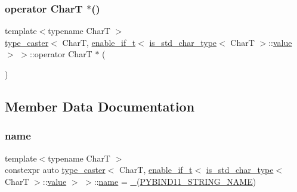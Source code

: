 \subsubsection{\texorpdfstring{operator CharT $\ast$()}{operator CharT *()}}
{\footnotesize\ttfamily template$<$typename CharT $>$ \\
\mbox{\hyperlink{classtype__caster}{type\+\_\+caster}}$<$ CharT, \mbox{\hyperlink{detail_2common_8h_a012819c9e8b5e04872a271f50f8b8196}{enable\+\_\+if\+\_\+t}}$<$ \mbox{\hyperlink{cast_8h_a0ee0eaf3d12f9b0e472ed620777ba3c3}{is\+\_\+std\+\_\+char\+\_\+type}}$<$ CharT $>$\+::\mbox{\hyperlink{_s_d_l__opengl__glext_8h_a8ad81492d410ff2ac11f754f4042150f}{value}} $>$ $>$\+::operator CharT $\ast$ (\begin{DoxyParamCaption}{ }\end{DoxyParamCaption})\hspace{0.3cm}{\ttfamily [inline]}}



\subsection{Member Data Documentation}
\mbox{\label{structtype__caster_3_01_char_t_00_01enable__if__t_3_01is__std__char__type_3_01_char_t_01_4_1_1value_01_4_01_4_ac5b1cfa08e19fa977b842cf65d4e5722}} 
\subsubsection{\texorpdfstring{name}{name}}
{\footnotesize\ttfamily template$<$typename CharT $>$ \\
constexpr auto \mbox{\hyperlink{classtype__caster}{type\+\_\+caster}}$<$ CharT, \mbox{\hyperlink{detail_2common_8h_a012819c9e8b5e04872a271f50f8b8196}{enable\+\_\+if\+\_\+t}}$<$ \mbox{\hyperlink{cast_8h_a0ee0eaf3d12f9b0e472ed620777ba3c3}{is\+\_\+std\+\_\+char\+\_\+type}}$<$ CharT $>$\+::\mbox{\hyperlink{_s_d_l__opengl__glext_8h_a8ad81492d410ff2ac11f754f4042150f}{value}} $>$ $>$\+::\mbox{\hyperlink{structname}{name}} = \mbox{\hyperlink{descr_8h_af114703e20c6527e87163eb2798f74b8}{\+\_\+}}(\mbox{\hyperlink{detail_2common_8h_a4490c1733364f04fcea017da2eb38d38}{P\+Y\+B\+I\+N\+D11\+\_\+\+S\+T\+R\+I\+N\+G\+\_\+\+N\+A\+ME}})\hspace{0.3cm}{\ttfamily [static]}}

